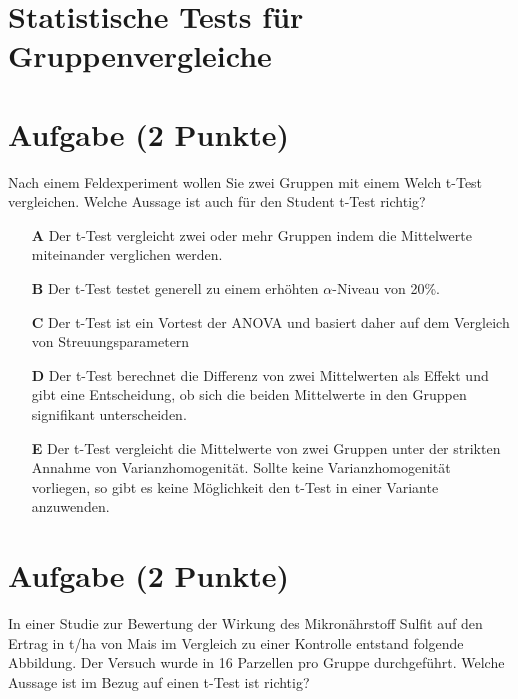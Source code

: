 \documentclass[a4paper, 9pt]{scrartcl}\usepackage[]{graphicx}\usepackage[]{xcolor}
\begin{document}
\section*{Statistische Tests für Gruppenvergleiche} 

\section{Aufgabe \hfill (2 Punkte)}



Nach einem Feldexperiment wollen Sie zwei Gruppen mit einem Welch t-Test vergleichen. Welche Aussage ist auch für den Student t-Test richtig?



\begin{enumerate}
\item [\textbf{A} \msquare] Der t-Test vergleicht zwei oder mehr Gruppen indem die Mittelwerte miteinander verglichen werden.
\item [\textbf{B} \msquare] Der t-Test testet generell zu einem erhöhten $\alpha$-Niveau von 20\%.
\item [\textbf{C} \msquare] Der t-Test ist ein Vortest der ANOVA und basiert daher auf dem Vergleich von Streuungsparametern
\item [\textbf{D} \msquare] Der t-Test berechnet die Differenz von zwei Mittelwerten als Effekt und gibt eine Entscheidung, ob sich die beiden Mittelwerte in den Gruppen signifikant unterscheiden.
\item [\textbf{E} \msquare] Der t-Test vergleicht die Mittelwerte von zwei Gruppen unter der strikten Annahme von Varianzhomogenität. Sollte keine Varianzhomogenität vorliegen, so gibt es keine Möglichkeit den t-Test in einer Variante anzuwenden.
\end{enumerate}

\section{Aufgabe \hfill (2 Punkte)}



In einer Studie zur Bewertung der Wirkung des Mikronährstoff Sulfit auf den Ertrag in t/ha  von Mais im Vergleich zu einer Kontrolle entstand folgende Abbildung. Der Versuch wurde in 16 Parzellen pro Gruppe durchgeführt. Welche Aussage ist im Bezug auf einen t-Test ist richtig?
\end{document}

